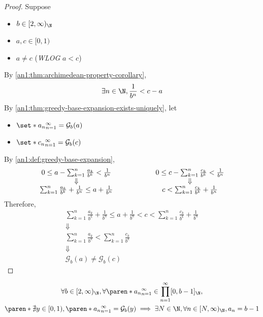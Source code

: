 \begin{proof}
  Suppose
  \begin{itemize}
    \item $b \in [2, \infty)_{\N}$
    \item $a, c \in [0, 1)$
    \item $a \neq c$ (\emph{WLOG} $a < c$)
  \end{itemize}
  By \cref{an1:thm:archimedean-property-corollary},
  \[
    \exists n \in \N, \frac{1}{b^{n}} < c - a
  \]
  By \cref{an1:thm:greedy-base-expansion-exists-uniquely}, let
  \begin{itemize}
    \item $\set*{a_{n}}_{n = 1}^{\infty} = \mathcal{G}_{b}(a)$
    \item $\set*{c_{n}}_{n = 1}^{\infty} = \mathcal{G}_{b}(c)$
  \end{itemize}
  By \cref{an1:def:greedy-base-expansion},
  \[
    \begin{array}{c@{\qquad\qquad\qquad}c}
      0 \leq a - \sum_{k = 1}^{n} \frac{a_{k}}{b^{k}} < \frac{1}{b^{n}}
       & 0 \leq c - \sum_{k = 1}^{n} \frac{c_{k}}{b^{k}} < \frac{1}{b^{n}} \\
      \Downarrow
       & \Downarrow                                                        \\
      \sum_{k = 1}^{n} \frac{a_{k}}{b^{k}} + \frac{1}{b^{n}} \leq a + \frac{1}{b^{n}}
       & c < \sum_{k = 1}^{n} \frac{c_{k}}{b^{k}} + \frac{1}{b^{n}}
    \end{array}
  \]
  Therefore,
  \[
    \begin{array}{c}
      \sum_{k = 1}^{n} \frac{a_{k}}{b^{k}} + \frac{1}{b^{n}} \leq a + \frac{1}{b^{n}}
      < c < \sum_{k = 1}^{n} \frac{c_{k}}{b^{k}} + \frac{1}{b^{n}}                \\
      \Downarrow                                                                  \\
      \sum_{k = 1}^{n} \frac{a_{k}}{b^{k}} < \sum_{k = 1}^{n} \frac{c_{k}}{b^{k}} \\
      \Downarrow                                                                  \\
      \mathcal{G}_{b}(a) \neq \mathcal{G}_{b}(c)
    \end{array}
  \]
\end{proof}

\begin{theorem} \label{an1:thm:no-real-number-matching-greedy-base-expansion}
  \[
    \begin{gathered}
      \forall b \in [2, \infty)_{\N}, \forall \paren*{a_{n}}_{n = 1}^{\infty}
      \in \prod_{n = 1}^{\infty} [0, b - 1]_{\N}, \\
      \paren*{\nexists y \in [0, 1), \paren*{a_{n}}_{n = 1}^{\infty} = \mathcal{G}_{b}(y)}
      \implies \exists N \in \N, \forall n \in [N, \infty)_{\N}, a_{n} = b - 1
    \end{gathered}
  \]
\end{theorem}
